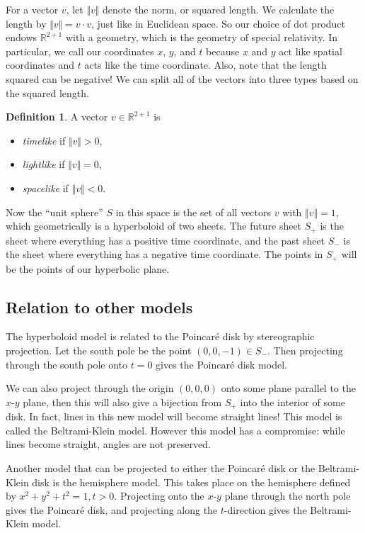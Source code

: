 \documentclass{article}
\theoremstyle{definition}
\newtheorem{defn}[thm]{Definition}
\theoremstyle{remark}
\begin{document}
For a vector $v$, let $\Vert v\Vert$ denote the norm, or squared length. We calculate the length by $\Vert v\Vert=v\cdot v$, just like in Euclidean space. So our choice of dot product endows $\mathbb R^{2+1}$ with a geometry, which is the geometry of special relativity. In particular, we call our coordinates $x$, $y$, and $t$ because $x$ and $y$ act like spatial coordinates and $t$ acts like the time coordinate. Also, note that the length squared can be negative! We can split all of the vectors into three types based on the squared length.
\begin{defn}
    A vector $v\in\mathbb R^{2+1}$ is
    \begin{itemize}
        \item \emph{timelike} if $\Vert v\Vert>0$,
        \item \emph{lightlike} if $\Vert v\Vert=0$,
        \item \emph{spacelike} if $\Vert v\Vert<0$.
    \end{itemize}
\end{defn}

Now the ``unit sphere'' $S$ in this space is the set of all vectors $v$ with $\Vert v\Vert=1$, which geometrically is a hyperboloid of two sheets. The future sheet $S_+$ is the sheet where everything has a positive time coordinate, and the past sheet $S_-$ is the sheet where everything has a negative time coordinate. The points in $S_+$ will be the points of our hyperbolic plane.

\subsection{Relation to other models}
The hyperboloid model is related to the Poincar\'e disk by stereographic projection. Let the south pole be the point $(0,0,-1)\in S_-$. Then projecting through the south pole onto $t=0$ gives the Poincar\'e disk model.

We can also project through the origin $(0,0,0)$ onto some plane parallel to the $x$-$y$ plane, then this will also give a bijection from $S_+$ into the interior of some disk. In fact, lines in this new model will become straight lines! This model is called the Beltrami-Klein model. However this model has a compromise: while lines become straight, angles are not preserved.

Another model that can be projected to either the Poincar\'e disk or the Beltrami-Klein disk is the hemisphere model. This takes place on the hemisphere defined by $x^2+y^2+t^2=1,t>0$. Projecting onto the $x$-$y$ plane through the north pole gives the Poincar\'e disk, and projecting along the $t$-direction gives the Beltrami-Klein model.
\end{document}
